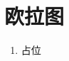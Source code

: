 \documentclass[../../main.tex]{subfiles}
\begin{document}
\section{欧拉图}
\begin{enumerate}
    \item 占位
\end{enumerate}
\end{document}
